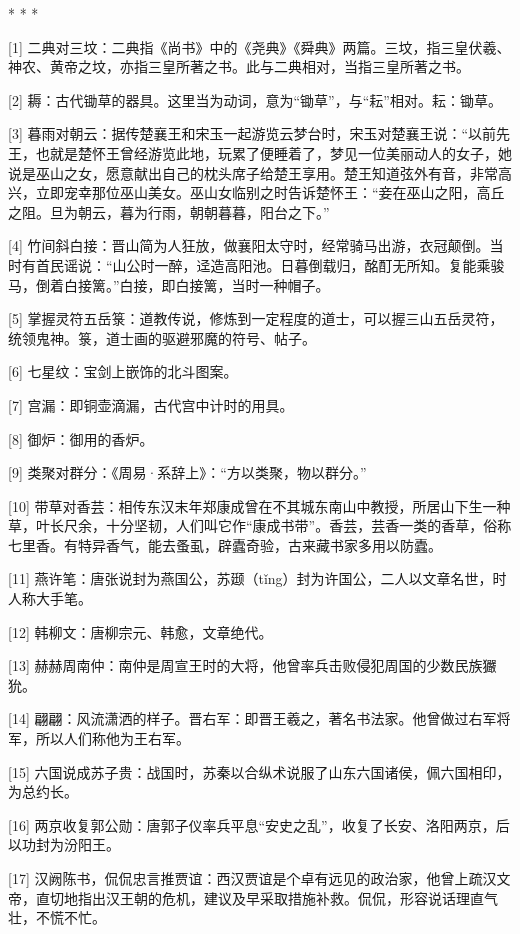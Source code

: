 \documentclass[12pt,UTF8]{ctexbook}
\begin{document}
* * *



[1] 二典对三坟：二典指《尚书》中的《尧典》《舜典》两篇。三坟，指三皇伏羲、神农、黄帝之坟，亦指三皇所著之书。此与二典相对，当指三皇所著之书。

[2] 耨：古代锄草的器具。这里当为动词，意为“锄草”，与“耘”相对。耘：锄草。

[3] 暮雨对朝云：据传楚襄王和宋玉一起游览云梦台时，宋玉对楚襄王说：“以前先王，也就是楚怀王曾经游览此地，玩累了便睡着了，梦见一位美丽动人的女子，她说是巫山之女，愿意献出自己的枕头席子给楚王享用。楚王知道弦外有音，非常高兴，立即宠幸那位巫山美女。巫山女临别之时告诉楚怀王：“妾在巫山之阳，高丘之阻。旦为朝云，暮为行雨，朝朝暮暮，阳台之下。”

[4] 竹间斜白接：晋山简为人狂放，做襄阳太守时，经常骑马出游，衣冠颠倒。当时有首民谣说：“山公时一醉，迳造高阳池。日暮倒载归，酩酊无所知。复能乘骏马，倒着白接篱。”白接，即白接篱，当时一种帽子。

[5] 掌握灵符五岳箓：道教传说，修炼到一定程度的道士，可以握三山五岳灵符，统领鬼神。箓，道士画的驱避邪魔的符号、帖子。

[6] 七星纹：宝剑上嵌饰的北斗图案。

[7] 宫漏：即铜壶滴漏，古代宫中计时的用具。

[8] 御炉：御用的香炉。

[9] 类聚对群分：《周易·系辞上》：“方以类聚，物以群分。”

[10] 带草对香芸：相传东汉末年郑康成曾在不其城东南山中教授，所居山下生一种草，叶长尺余，十分坚韧，人们叫它作“康成书带”。香芸，芸香一类的香草，俗称七里香。有特异香气，能去蚤虱，辟蠹奇验，古来藏书家多用以防蠹。

[11] 燕许笔：唐张说封为燕国公，苏颋（tǐng）封为许国公，二人以文章名世，时人称大手笔。

[12] 韩柳文：唐柳宗元、韩愈，文章绝代。

[13] 赫赫周南仲：南仲是周宣王时的大将，他曾率兵击败侵犯周国的少数民族玁狁。

[14] 翩翩：风流潇洒的样子。晋右军：即晋王羲之，著名书法家。他曾做过右军将军，所以人们称他为王右军。

[15] 六国说成苏子贵：战国时，苏秦以合纵术说服了山东六国诸侯，佩六国相印，为总约长。

[16] 两京收复郭公勋：唐郭子仪率兵平息“安史之乱”，收复了长安、洛阳两京，后以功封为汾阳王。

[17] 汉阙陈书，侃侃忠言推贾谊：西汉贾谊是个卓有远见的政治家，他曾上疏汉文帝，直切地指出汉王朝的危机，建议及早采取措施补救。侃侃，形容说话理直气壮，不慌不忙。
\end{document}
